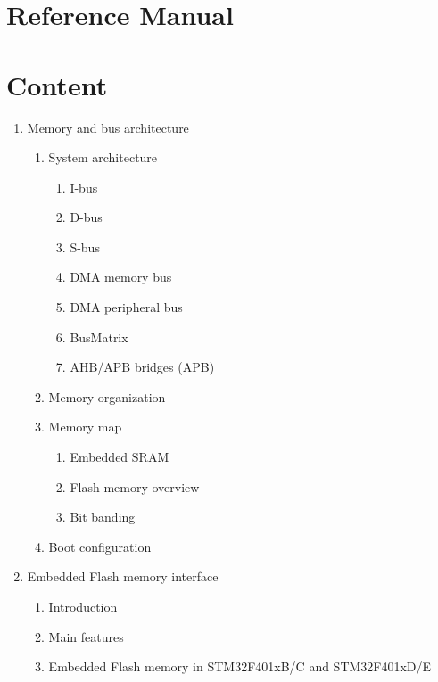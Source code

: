 \documentclass{article}
\begin{document}
\section*{Reference Manual}

\tableofcontents

\section*{Content}
\begin{enumerate}
    \item Memory and bus architecture 
    \begin{enumerate}
        \item System architecture 
        \begin{enumerate}
            \item I-bus 
            \item D-bus 
            \item S-bus 
            \item DMA memory bus 
            \item DMA peripheral bus 
            \item BusMatrix 
            \item AHB/APB bridges (APB) 
        \end{enumerate}
        \item Memory organization 
        \item Memory map 
        \begin{enumerate}
            \item Embedded SRAM 
            \item Flash memory overview 
            \item Bit banding 
        \end{enumerate}
        \item Boot configuration 
    \end{enumerate}
    \item Embedded Flash memory interface 
    \begin{enumerate}
        \item Introduction 
        \item Main features 
        \item Embedded Flash memory in STM32F401xB/C and STM32F401xD/E 

\end{enumerate}
\end{enumerate}
\end{document}
